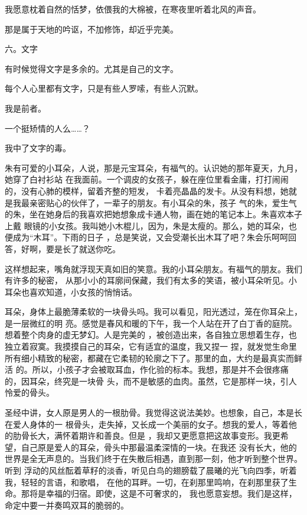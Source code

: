 \documentclass[12pt,a4paper]{article}
\newcommand{\subpart}[1]{
	\begingroup \par
	\vspace{1ex} \centering #1
	\par \endgroup \nopagebreak[4]
}
\begin{document}
		我愿意枕着自然的恬梦，依偎我的大棉被，在寒夜里听着北风的声音。

		那是属于天地的吟讴，不加修饰，却近乎完美。

		\subpart{六。文字}

		有时候觉得文字是多余的。尤其是自己的文字。

		每个人心里都有文字，只是有些人罗嗦，有些人沉默。

		我是前者。

		一个挺矫情的人么……？

		我中了文字的毒。

	\endwriting



		朱有可爱的小耳朵，人说，那是元宝耳朵，有福气的。认识她的那年夏天，九月，她穿了白衬衫站
	在我面前。一个调皮的女孩子，躲在座位里看金庸，打打闹闹的，没有心肺的模样，留着齐整的短发，
	卡着亮晶晶的发卡。从没有料想，她就是我最亲密贴心的伙伴了，一辈子的朋友。有小耳朵的朱，孩子
	气的朱，爱生气的朱，坐在她身后的我喜欢把她想象成卡通人物，画在她的笔记本上。朱喜欢本子上戴
	眼镜的小女孩。我叫她小木棍儿，因为，朱是太瘦的。那么，她的耳朵，也便成为“木耳”。下雨的日子
	，总是笑说，又会受潮长出木耳了吧？朱会乐呵呵回答，好啊，要是长了就送你吃。


		这样想起来，嘴角就浮现天真如旧的笑意。我的小耳朵朋友。有福气的朋友。我们有许多的秘密，
	从那小小的耳廓间保藏，我们有太多的笑语，被小耳朵听见。小耳朵也喜欢知道，小女孩的悄悄话。


		耳朵，身体上最脆薄柔软的一块骨头吗。我可以看见，阳光透过，笼在你耳朵上，是一层微红的明
	亮。感觉是春风和暖的下午，我一个人站在开了白丁香的庭院。想着整个肉身的虚无梦幻。人是完美的
	，被创造出来，各自独立思想着生存，也独立着寂寞。我摸摸自己的耳朵，它有适宜的温度，我又捏一
	捏，就发觉生命里所有细小精致的秘密，都藏在它柔韧的轮廓之下了。那里的血，大约是最真实而鲜活
	的。所以，小孩子才会被取耳血，作化验的标本。我想，那是并不会很疼痛的，因耳朵，终究是一块骨
	头，而不是敏感的血肉。虽然，它是那样一块，引人怜爱的骨头。


		圣经中讲，女人原是男人的一根肋骨。我觉得这说法美妙。也想象，自己，本是长在爱人身体的一
	根骨头，走失掉，又长成一个美丽的女子。想我的爱人，等着他的肋骨长大，满怀着期许和善良。但是
	，我却又更愿意把这故事变形。我更希望，自己原是爱人的耳朵，骨头中那最温柔深情的一块。在我还
	没有长大，他的世界是全无声息的。当我们终于在失散后相遇，直到那一刻，他才听到整个世界。听到
	浮动的风丝酝着草籽的淡香，听见白鸟的翅膀载了晨曦的光飞向四季，听着我，轻轻的言语，和歌唱，
	在他的耳畔。一切，在刹那里鸣响，在刹那里获了生命。那将是幸福的归宿。即使，这是不可奢求的，
	我也愿意妄想。我们是这样，命定中要一并奏鸣双耳的脆弱的。
\end{document}
